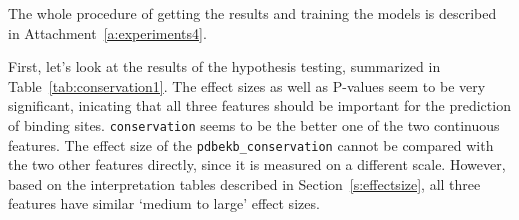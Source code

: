 The whole procedure of getting the results and training the models is described in Attachment~\ref{a:experiments4}.

First, let's look at the results of the hypothesis testing, summarized in Table~\ref{tab:conservation1}. The effect sizes as well as P-values seem to be very significant, inicating that all three features should be important for the prediction of binding sites. \texttt{conservation} seems to be the better one of the two continuous features. The effect size of the \texttt{pdbekb\_conservation} cannot be compared with the two other features directly, since it is measured on a different scale. However, based on the interpretation tables described in Section~\ref{s:effectsize}, all three features have similar `medium to large' effect sizes.


